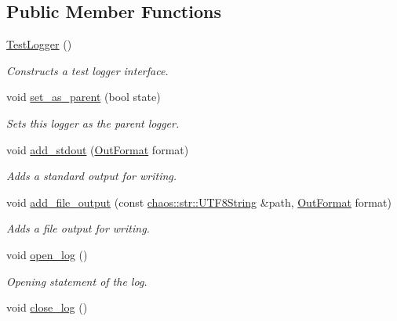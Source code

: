 \subsection*{Public Member Functions}
\begin{DoxyCompactItemize}
\item 
\hyperlink{classchaos_1_1test_1_1_test_logger_a59b5462eea92053f301b8c5e9c61892f}{Test\+Logger} ()
\begin{DoxyCompactList}\small\item\em Constructs a test logger interface. \end{DoxyCompactList}\item 
void \hyperlink{classchaos_1_1test_1_1_test_logger_a95a0c9aa1345a94f84e41caa71e6e8ab}{set\+\_\+as\+\_\+parent} (bool state)
\begin{DoxyCompactList}\small\item\em Sets this logger as the parent logger. \end{DoxyCompactList}\item 
void \hyperlink{classchaos_1_1test_1_1_test_logger_a2d6d82c3256d5eb4c0a5b7d8fae86355}{add\+\_\+stdout} (\hyperlink{classchaos_1_1test_1_1_test_logger_a8e6f679501d623e41ac0f0c445a7820d}{Out\+Format} format)
\begin{DoxyCompactList}\small\item\em Adds a standard output for writing. \end{DoxyCompactList}\item 
void \hyperlink{classchaos_1_1test_1_1_test_logger_adf7612679442ae1b804d2d3e9390b9b8}{add\+\_\+file\+\_\+output} (const \hyperlink{classchaos_1_1str_1_1_u_t_f8_string}{chaos\+::str\+::\+U\+T\+F8\+String} \&path, \hyperlink{classchaos_1_1test_1_1_test_logger_a8e6f679501d623e41ac0f0c445a7820d}{Out\+Format} format)
\begin{DoxyCompactList}\small\item\em Adds a file output for writing. \end{DoxyCompactList}\item 
\hypertarget{classchaos_1_1test_1_1_test_logger_a81eb3642eda4f8b3a4efa98d78b40592}{}void \hyperlink{classchaos_1_1test_1_1_test_logger_a81eb3642eda4f8b3a4efa98d78b40592}{open\+\_\+log} ()\label{classchaos_1_1test_1_1_test_logger_a81eb3642eda4f8b3a4efa98d78b40592}

\begin{DoxyCompactList}\small\item\em Opening statement of the log. \end{DoxyCompactList}\item 
\hypertarget{classchaos_1_1test_1_1_test_logger_a3ba359890fa3daa7257657e6b3db4d90}{}void \hyperlink{classchaos_1_1test_1_1_test_logger_a3ba359890fa3daa7257657e6b3db4d90}{close\+\_\+log} ()\label{classchaos_1_1test_1_1_test_logger_a3ba359890fa3daa7257657e6b3db4d90}


\end{DoxyCompactItemize}

